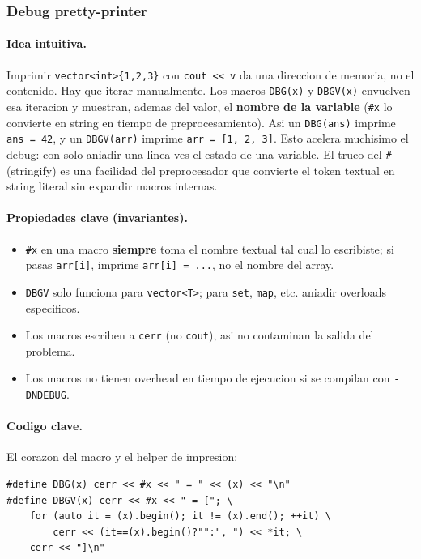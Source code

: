 ﻿\subsubsection{Debug pretty-printer}

\paragraph{Idea intuitiva.}
Imprimir \texttt{vector<int>\{1,2,3\}} con \texttt{cout << v} da una direccion de memoria, no el contenido. Hay que iterar manualmente. Los macros \texttt{DBG(x)} y \texttt{DBGV(x)} envuelven esa iteracion y muestran, ademas del valor, el \textbf{nombre de la variable} (\texttt{\#x} lo convierte en string en tiempo de preprocesamiento). Asi un \texttt{DBG(ans)} imprime \texttt{ans = 42}, y un \texttt{DBGV(arr)} imprime \texttt{arr = [1, 2, 3]}. Esto acelera muchisimo el debug: con solo aniadir una linea ves el estado de una variable. El truco del \texttt{\#} (stringify) es una facilidad del preprocesador que convierte el token textual en string literal sin expandir macros internas.

\paragraph{Propiedades clave (invariantes).}
\begin{itemize}\setlength\itemsep{0pt}
	\item \texttt{\#x} en una macro \textbf{siempre} toma el nombre textual tal cual lo escribiste; si pasas \texttt{arr[i]}, imprime \texttt{arr[i] = ...}, no el nombre del array.
	\item \texttt{DBGV} solo funciona para \texttt{vector<T>}; para \texttt{set}, \texttt{map}, etc. aniadir overloads especificos.
	\item Los macros escriben a \texttt{cerr} (no \texttt{cout}), asi no contaminan la salida del problema.
	\item Los macros no tienen overhead en tiempo de ejecucion si se compilan con \texttt{-DNDEBUG}.
\end{itemize}

\paragraph{Codigo clave.}
El corazon del macro y el helper de impresion:
\begin{verbatim}
#define DBG(x) cerr << #x << " = " << (x) << "\n"
#define DBGV(x) cerr << #x << " = ["; \
    for (auto it = (x).begin(); it != (x).end(); ++it) \
        cerr << (it==(x).begin()?"":", ") << *it; \
    cerr << "]\n"
\end{verbatim}

